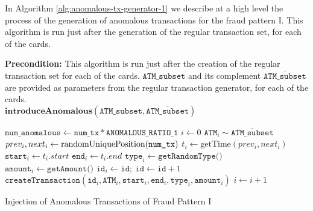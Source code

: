 In Algorithm \ref{alg:anomalous-tx-generator-1} we describe at a high level the process of the generation of anomalous transactions for the fraud pattern I. This algorithm is run just after the generation of the regular transaction set, for each of the cards. 

\begin{algorithm}[H]
  \small
    \textbf{Precondition:} This algorithm is run just after the creation of the regular transaction set for each of the cards. $\texttt{ATM\_subset}$ and its complement $\overline{\texttt{ATM\_subset}}$ are provided as parameters from the regular transaction generator, for each of the cards.\\[5pt]
  $\textbf{introduceAnomalous}(\texttt{ATM\_subset}, \overline{\texttt{ATM\_subset}})$
  \begin{algorithmic}[1]
  \STATE $\texttt{num\_anomalous} \gets \texttt{num\_tx} * \texttt{ANOMALOUS\_RATIO\_1}$
  \STATE $i \gets 0$
      \STATE $\texttt{ATM}_{i} \sim \overline{\texttt{ATM\_subset}}$
      \STATE $prev_i, next_i \gets \text{randomUniquePosition(\texttt{num\_tx})}$
      \STATE $t_i \gets \text{getTime}(prev_i, next_i)$
      \STATE $\texttt{start}_{i} \gets t_i.start$
      \STATE $\texttt{end}_{i} \gets t_i.end$
      \STATE $\texttt{type}_{i} \gets \texttt{getRandomType()}$
      \STATE $\texttt{amount}_{i} \gets \texttt{getAmount()}$
      \STATE $\texttt{id}_{i} \gets \texttt{id}; \ \texttt{id} \gets \texttt{id} + 1$
      \STATE $\texttt{createTransaction}(\texttt{id}_{i}, \texttt{ATM}_i, \texttt{start}_{i},\texttt{end}_{i}, \texttt{type}_{i}, \texttt{amount}_i)$
      \STATE $i \gets i + 1$
  \ENDWHILE
  \end{algorithmic}
  \caption{Injection of Anomalous Transactions of Fraud Pattern I}
  \label{alg:anomalous-tx-generator-1}
\end{algorithm}


